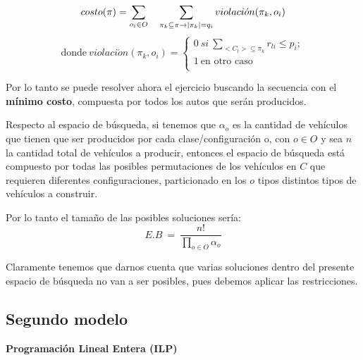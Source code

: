 $$costo(\pi) = \sum_{o_{i}\in O} \ \ \ \sum_{\pi_{k}\subseteq \pi\\ \rightarrow |\pi_{k}|=q_i} violaci\acute{o}n(\pi_{k},o_{i})$$
$$\text{donde}\ violaci\acute{o}n(\pi_{k},o_{i}) = \left\{
 \begin{array}{l}
	0\ si\ \sum\limits_{<C_l>\subseteq\pi_k}r_{li}\leq p_i;\\
	1\ \text{en otro caso}\\
 \end{array} \right.$$


Por lo tanto se puede resolver ahora el ejercicio buscando la secuencia con el \textbf{mínimo costo}, compuesta por todos los autos
que serán producidos.

%

Respecto al espacio de búsqueda, si tenemos que $\alpha_o$ es la cantidad de vehículos que tienen que ser producidos
por cada clase/configuración o, con $o\in O$ y sea $n$ la cantidad total de vehículos a producir,
entonces el espacio de búsqueda está compuesto por todas las posibles permutaciones de los vehículos en $C$ que
requieren diferentes configuraciones, particionado en los $o$ tipos distintos tipos de vehículos a construir.

Por lo tanto el tamaño de las posibles soluciones sería:
$$E.B\ =\ \frac{n!}{\prod\limits_{o \in O}\alpha_o}$$
 
Claramente tenemos que darnos cuenta que varias soluciones dentro del presente espacio de búsqueda
no van a ser posibles, pues debemos aplicar las restricciones.

\subsection{Segundo modelo}
\textbf{Programación Lineal Entera (ILP)}

